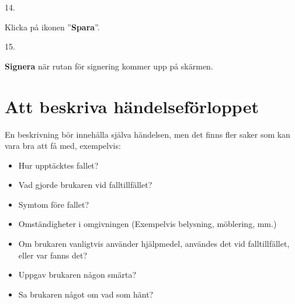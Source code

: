 \documentclass[paper=a5,DIV=15,headinclude,twoside=semi,openany,titlepage=firstiscover]{scrbook}
\begin{document}
\noindent\hrulefill

\vfill
\noindent
\begin{minipage}[t]{0.06\textwidth}
	14.
\end{minipage}%
\begin{minipage}[t]{.44\textwidth}\raggedright
	Klicka på ikonen ”\textbf{Spara}”.
\end{minipage}%
\begin{minipage}[t]{.5\textwidth}
	\hfill{}
\end{minipage}
\vfill

\noindent\hrulefill

\vfill
\noindent
\begin{minipage}[t]{0.06\textwidth}
	15.
\end{minipage}%
\begin{minipage}[t]{.44\textwidth}\raggedright
	\textbf{Signera} när rutan för signering kommer upp på skärmen.
\end{minipage}%
\begin{minipage}[t]{.5\textwidth}
	\hfill{}
\end{minipage}
\vfill

\noindent\hrulefill

\clearpage
\justify
\section*{Att beskriva händelseförloppet}
En beskrivning bör innehålla själva händelsen, men det finns fler saker som kan vara bra att få med, exempelvis:
\begin{itemize}
	\item Hur upptäcktes fallet?
	\item Vad gjorde brukaren vid falltillfället?
	\item Symtom före fallet?
	\item Omständigheter i omgivningen (Exempelvis belysning, möblering, mm.)
	\item Om brukaren vanligtvis använder hjälpmedel, användes det vid falltillfället, eller var fanns det?
	\item Uppgav brukaren någon smärta?
	\item Sa brukaren något om vad som hänt?
\end{itemize}
\end{document}
